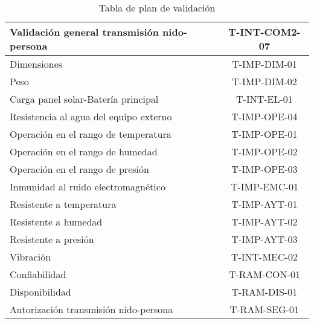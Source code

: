 \begin{table}[H]
\begin{tabular}{|l|c|}
Validación general transmisión nido-persona                                                                          & T-INT-COM2-07        \\ \hline
Dimensiones                                                                                                          & T-IMP-DIM-01         \\ \hline
Peso                                                                                                                 & T-IMP-DIM-02         \\ \hline
Carga panel solar-Batería principal                                                                                  & T-INT-EL-01          \\ \hline
Resistencia al agua del equipo externo                                                                               & T-IMP-OPE-04         \\ \hline
Operación en el rango de temperatura                                                                                 & T-IMP-OPE-01         \\ \hline
Operación en el rango de humedad                                                                                     & T-IMP-OPE-02         \\ \hline
Operación en el rango de presión                                                                                     & T-IMP-OPE-03         \\ \hline
Inmunidad al ruido electromagnético                                                                                  & T-IMP-EMC-01         \\ \hline
Resistente a temperatura                                                                                             & T-IMP-AYT-01         \\ \hline
Resistente a humedad                                                                                                 & T-IMP-AYT-02         \\ \hline
Resistente a presión                                                                                                 & T-IMP-AYT-03         \\ \hline
Vibración                                                                                                            & T-INT-MEC-02         \\ \hline
Confiabilidad                                                                                                        & T-RAM-CON-01         \\ \hline
Disponibilidad                                                                                                       & T-RAM-DIS-01         \\ \hline
Autorización transmisión nido-persona                                                                                & T-RAM-SEG-01         \\ \hline
\end{tabular}
\caption{Tabla de plan de validación}
\end{table}